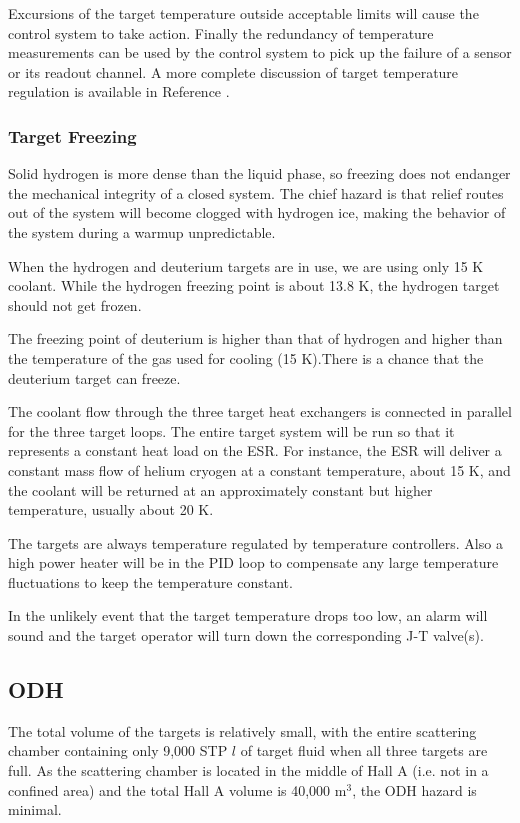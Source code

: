 Excursions of the target temperature outside acceptable limits will
cause the control system to take action.
Finally the redundancy of temperature measurements can be used by the
control system to pick up the failure of a sensor or its readout channel.
A more complete discussion of target temperature regulation is available
in Reference \cite{bi:tgts}.

\subsubsection{Target Freezing}

\begin{safetyen}{10}{5}
Solid hydrogen is more dense than the liquid phase, so freezing does not
endanger the mechanical integrity of a closed system. The chief hazard is that
relief routes out of the system will become clogged with hydrogen ice,
making the behavior of the system during a warmup unpredictable.
\end{safetyen} 
When the hydrogen and deuterium targets are in use,
we are using only 15 K coolant. While the hydrogen freezing point
is about 13.8 K, the hydrogen target should not get frozen. 
\begin{safetyen}{10}{5}
The freezing point of deuterium is higher than that of hydrogen
and higher than the temperature of the gas used for
cooling (15 K).There is 
a chance that the deuterium target can freeze.
\end{safetyen}

The coolant flow through the three target heat exchangers is
connected in parallel for the three target loops.
The entire target system will be run so that it
represents a constant heat load on the ESR. For instance,
the ESR will deliver
a constant mass flow of helium cryogen at a constant temperature, about
15 K, and the coolant will be returned at an approximately 
constant but higher temperature, usually about 20 K.

The targets are always temperature regulated by
temperature controllers. Also a high power heater will be in the PID loop
to compensate any large temperature fluctuations to keep the temperature 
constant.
\begin{safetyen}{10}{5}
In the unlikely event that the target temperature drops too low,
an alarm will sound and the target operator will turn down the corresponding
J-T valve(s). 

\subsection{ODH}

The total volume of the targets is relatively small, with the entire
scattering chamber containing only 9,000 STP $l$ of target
fluid when all three targets are full. As the scattering chamber
is located in the middle of Hall A
(i.e. not in a confined area) and the total Hall A volume is 40,000 m$^3$,
the ODH hazard is minimal.
\end{safetyen}

